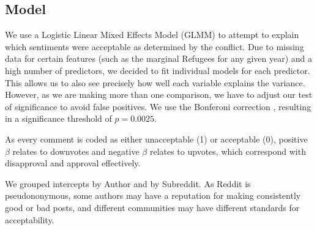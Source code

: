 \subsection{Model}
We use a Logistic Linear Mixed Effects Model (GLMM) to attempt to explain which sentiments were acceptable as determined by the conflict. Due to missing data for certain features (such as the marginal Refugees for any given year) and a high number of predictors, we decided to fit individual models for each predictor. This allows us to also see precisely how well each variable explains the variance. However, as we are making more than one comparison, we have to adjust our test of significance to avoid false positives. We use the Bonferoni correction \cite{bonferoni}, resulting in a significance threshold of $p=0.0025$.

As every comment is coded as either unacceptable (1) or acceptable (0), positive $\beta$ relates to downvotes and negative $\beta$ relates to upvotes, which correspond with disapproval and approval effectively.

We grouped intercepts by Author and by Subreddit. As Reddit is pseudononymous, some authors may have a reputation for making consistently good or bad posts, and different communities may have different standards for acceptability.